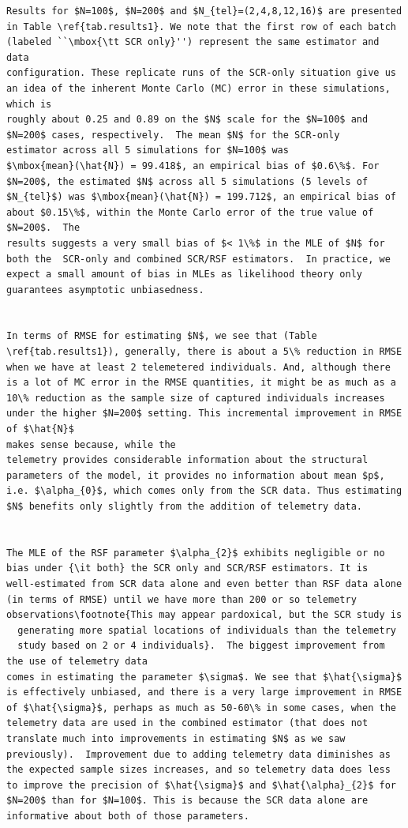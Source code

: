 \begin{verbatim}
Results for $N=100$, $N=200$ and $N_{tel}=(2,4,8,12,16)$ are presented
in Table \ref{tab.results1}. We note that the first row of each batch
(labeled ``\mbox{\tt SCR only}'') represent the same estimator and data
configuration. These replicate runs of the SCR-only situation give us
an idea of the inherent Monte Carlo (MC) error in these simulations, which is
roughly about 0.25 and 0.89 on the $N$ scale for the $N=100$ and
$N=200$ cases, respectively.  The mean $N$ for the SCR-only
estimator across all 5 simulations for $N=100$ was
$\mbox{mean}(\hat{N}) = 99.418$, an empirical bias of $0.6\%$. For
$N=200$, the estimated $N$ across all 5 simulations (5 levels of
$N_{tel}$) was $\mbox{mean}(\hat{N}) = 199.712$, an empirical bias of
about $0.15\%$, within the Monte Carlo error of the true value of $N=200$.  The
results suggests a very small bias of $< 1\%$ in the MLE of $N$ for
both the  SCR-only and combined SCR/RSF estimators.  In practice, we
expect a small amount of bias in MLEs as likelihood theory only
guarantees asymptotic unbiasedness.


In terms of RMSE for estimating $N$, we see that (Table
\ref{tab.results1}), generally, there is about a 5\% reduction in RMSE
when we have at least 2 telemetered individuals. And, although there
is a lot of MC error in the RMSE quantities, it might be as much as a
10\% reduction as the sample size of captured individuals increases
under the higher $N=200$ setting. This incremental improvement in RMSE
of $\hat{N}$
makes sense because, while the
telemetry provides considerable information about the structural
parameters of the model, it provides no information about mean $p$,
i.e. $\alpha_{0}$, which comes only from the SCR data. Thus estimating
$N$ benefits only slightly from the addition of telemetry data.


The MLE of the RSF parameter $\alpha_{2}$ exhibits negligible or no
bias under {\it both} the SCR only and SCR/RSF estimators. It is
well-estimated from SCR data alone and even better than RSF data alone
(in terms of RMSE) until we have more than 200 or so telemetry
observations\footnote{This may appear pardoxical, but the SCR study is
  generating more spatial locations of individuals than the telemetry
  study based on 2 or 4 individuals}.  The biggest improvement from the use of telemetry data
comes in estimating the parameter $\sigma$. We see that $\hat{\sigma}$
is effectively unbiased, and there is a very large improvement in RMSE
of $\hat{\sigma}$, perhaps as much as 50-60\% in some cases, when the
telemetry data are used in the combined estimator (that does not
translate much into improvements in estimating $N$ as we saw
previously).  Improvement due to adding telemetry data diminishes as
the expected sample sizes increases, and so telemetry data does less
to improve the precision of $\hat{\sigma}$ and $\hat{\alpha}_{2}$ for
$N=200$ than for $N=100$. This is because the SCR data alone are
informative about both of those parameters.



\end{verbatim}
